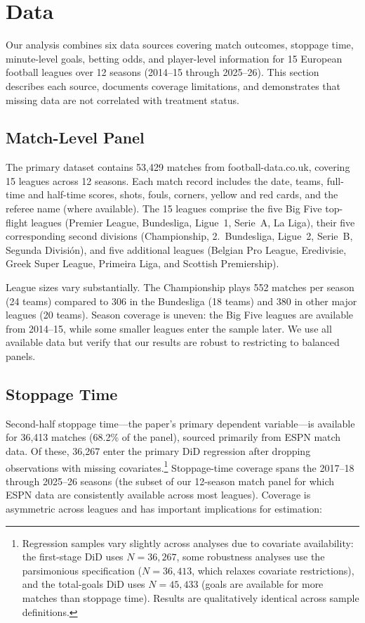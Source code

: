 \documentclass[12pt]{article}
\begin{document}
\section{Data}
\label{sec:data}

Our analysis combines six data sources covering match outcomes, stoppage time, minute-level goals, betting odds, and player-level information for 15 European football leagues over 12 seasons (2014--15 through 2025--26). This section describes each source, documents coverage limitations, and demonstrates that missing data are not correlated with treatment status.

\subsection{Match-Level Panel}

The primary dataset contains 53,429 matches from football-data.co.uk, covering 15 leagues across 12 seasons. Each match record includes the date, teams, full-time and half-time scores, shots, fouls, corners, yellow and red cards, and the referee name (where available). The 15 leagues comprise the five Big Five top-flight leagues (Premier League, Bundesliga, Ligue~1, Serie~A, La Liga), their five corresponding second divisions (Championship, 2.~Bundesliga, Ligue~2, Serie~B, Segunda Divisi\'{o}n), and five additional leagues (Belgian Pro League, Eredivisie, Greek Super League, Primeira Liga, and Scottish Premiership).

League sizes vary substantially. The Championship plays 552 matches per season (24 teams) compared to 306 in the Bundesliga (18 teams) and 380 in other major leagues (20 teams). Season coverage is uneven: the Big Five leagues are available from 2014--15, while some smaller leagues enter the sample later. We use all available data but verify that our results are robust to restricting to balanced panels.

\subsection{Stoppage Time}

Second-half stoppage time---the paper's primary dependent variable---is available for 36,413 matches (68.2\% of the panel), sourced primarily from ESPN match data. Of these, 36,267 enter the primary DiD regression after dropping observations with missing covariates.\footnote{Regression samples vary slightly across analyses due to covariate availability: the first-stage DiD uses $N = 36{,}267$, some robustness analyses use the parsimonious specification ($N = 36{,}413$, which relaxes covariate restrictions), and the total-goals DiD uses $N = 45{,}433$ (goals are available for more matches than stoppage time). Results are qualitatively identical across sample definitions.} Stoppage-time coverage spans the 2017--18 through 2025--26 seasons (the subset of our 12-season match panel for which ESPN data are consistently available across most leagues). Coverage is asymmetric across leagues and has important implications for estimation:
\end{document}
